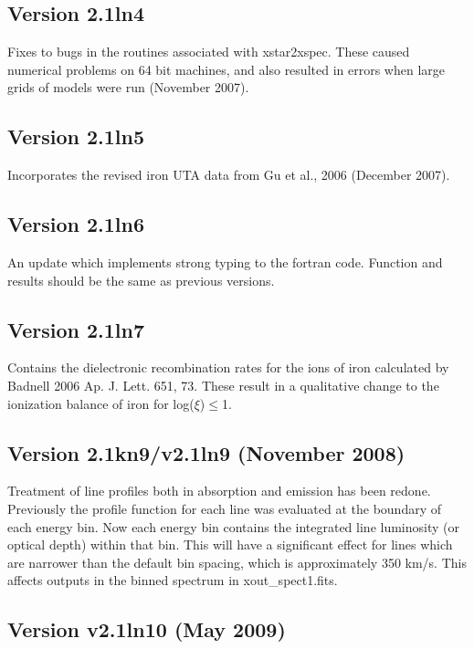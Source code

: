\subsection{Version 2.1ln4}

Fixes to bugs in the routines associated with xstar2xspec. These caused 
numerical problems on 64 bit machines, and also resulted in errors when 
large grids of models were run (November 2007).

\subsection{Version 2.1ln5}

Incorporates the revised iron UTA data from Gu et al., 2006 (December 2007).

\subsection{Version 2.1ln6}

An update which implements strong typing to the fortran code.  Function and
results should be the same as previous versions.

\subsection{Version 2.1ln7}

Contains the dielectronic recombination rates for the ions of iron calculated 
by Badnell 2006 Ap. J. Lett. 651, 73.  These result in a qualitative change to
the ionization balance of iron for log($\xi$)$\leq$1.

\subsection{Version 2.1kn9/v2.1ln9 (November 2008)}

Treatment of line profiles both in absorption and emission has been 
redone.  Previously the profile function for each line was 
evaluated at the boundary of each energy bin.  Now each energy bin 
contains the integrated line luminosity (or optical depth) within 
that bin.  This will have a significant effect for lines which 
are narrower than the default bin spacing, which is approximately 350 km/s.
This affects outputs in the binned spectrum in xout\_spect1.fits.

\subsection{Version v2.1ln10 (May 2009)}

